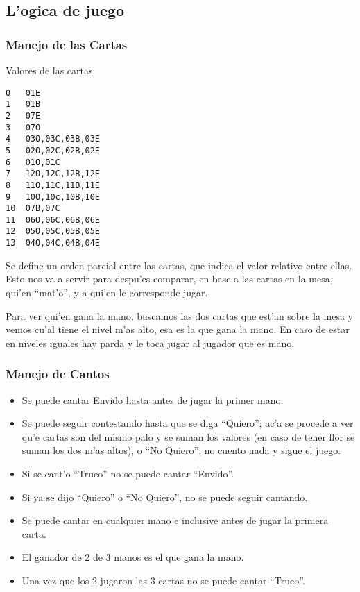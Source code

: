 \subsection{L'ogica de juego}

\subsubsection{Manejo de las Cartas}

Valores de las cartas:
\begin{verbatim}
0   01E
1   01B
2   07E
3   07O
4   03O,03C,03B,03E
5   02O,02C,02B,02E
6   01O,01C
7   12O,12C,12B,12E
8   11O,11C,11B,11E
9   10O,10c,10B,10E
10  07B,07C
11  06O,06C,06B,06E
12  05O,05C,05B,05E
13  04O,04C,04B,04E
\end{verbatim}

Se define un orden parcial entre las cartas, que indica el valor relativo entre ellas. Esto nos va a servir para despu'es comparar, en base a las cartas en la mesa, qui'en ``mat'o'', y a qui'en le corresponde jugar.

Para ver qui'en gana la mano, buscamos las dos cartas que est'an sobre la mesa y vemos cu'al tiene el nivel m'as alto, esa es la que gana la mano. En caso de estar en niveles iguales hay parda y le toca jugar al jugador que es mano.


\subsubsection{Manejo de Cantos}

\begin{itemize}
\item Se puede cantar Envido hasta antes de jugar la primer mano.
\item Se puede seguir contestando hasta que se diga ``Quiero''; ac'a se procede a ver qu'e cartas son del mismo palo y se suman los valores (en caso de tener flor se suman los dos m'as altos), o ``No Quiero''; no cuento nada y sigue el juego.
\item Si se cant'o ``Truco'' no se puede cantar ``Envido''.
\item Si ya se dijo ``Quiero'' o ``No Quiero'', no se puede seguir cantando.
\end{itemize}


\begin{itemize}
\item Se puede cantar en cualquier mano e inclusive antes de jugar la primera carta.
\item El ganador de 2 de 3 manos es el que gana la mano.
\item Una vez que los 2 jugaron las 3 cartas no se puede cantar ``Truco''.
\end{itemize}

